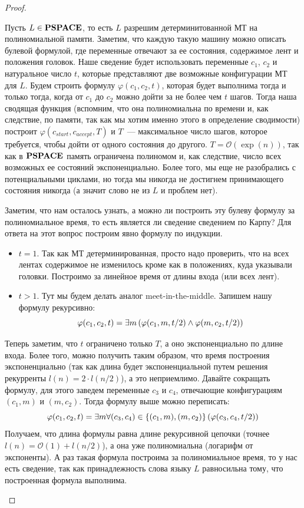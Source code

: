 \begin{proof}
\begin{enumerate}
\begin{lemmanote}
    \end{lemmanote} 
    
    Пусть $L \in \textbf{PSPACE}$, то есть $L$ разрешим детерминитованной МТ на полиномиальной памяти. Заметим, что каждую такую машину можно описать булевой формулой, где переменные отвечают за ее состояния, содержимое лент и положения головок. Наше сведение будет использовать переменные $c_1$, $c_2$ и натуральное число $t$, которые представляют две возможные конфигурации МТ для $L$. Будем строить формулу $\varphi(c_1, c_2, t)$, которая будет выполнима тогда и только тогда, когда от $c_1$ до $c_2$ можно дойти за не более чем $t$ шагов. Тогда наша сводящая функция (вспомним, что она полиномиальна по времени и, как следствие, по памяти, так как мы хотим именно этого в определение \psp сводимости) построит $\varphi(c_{start}, c_{accept}, T)$ и $T$~--- максимальное число шагов, которое требуется, чтобы дойти от одного состояния до другого. $T = \mathcal{O}(\exp(n))$, так как в $\textbf{PSPACE}$ память ограничена полиномом и, как следствие, число всех возможных ее состояний экспоненциально. Более того, мы еще не разобрались с потенциальными циклами, но тогда мы никогда не достигнем принимающего состояния никогда (а значит слово не из $L$ и проблем нет).
    
    Заметим, что нам осталось узнать, а можно ли построить эту булеву формулу за полиномиальное время, то есть является ли сведение сведением по Карпу? Для ответа на этот вопрос построим явно формулу по индукции.
    
    \begin{itemize}
        \item $t = 1$. Так как МТ детерминированная, просто надо проверить, что на всех лентах содержимое не изменилось кроме как в положениях, куда указывали головки. Построимо за линейное время от длины входа (или всех лент).
        \item $t > 1$. Тут мы будем делать аналог meet-in-the-middle. Запишем нашу формулу рекурсивно:
        $$
        \varphi(c_1, c_2, t) = \exists m\left({\varphi(c_1, m, t/2) \wedge \varphi(m, c_2, t/2)}\right)
        $$
    \end{itemize}
    
    Теперь заметим, что $t$ ограничено только $T$, а оно экспоненциально по длине входа. Более того, можно получить таким образом, что время построения экспоненциально (так как длина будет экспоненциальной путем решения рекурренты $l(n) = 2\cdot l(n/2)$), а это неприемлимо. Давайте сокращать формулу, для этого заведем переменные $c_3$ и $c_4$, отвечающие конфигурациям $(c_1, m)$ и $(m, c_2)$. Тогда формулу выше можно переписать:
    $$
    \varphi(c_1, c_2, t) = \exists m\forall (c_3, c_4) \in \{(c_1, m), (m, c_2)\} \left({\varphi(c_3, c_4, t/2)}\right)
    $$
    Получаем, что длина формулы равна длине рекурсивной цепочки (точнее $l(n) = \mathcal{O}(1) + l(n/2)$), а она уже полиномиальна (логарифм от экспоненты). А раз такая формула построима за полиномиальное время, то у нас есть сведение, так как принадлежность слова языку $L$ равносильна тому, что построенная формула выполнима.
\end{enumerate}

\end{proof}
